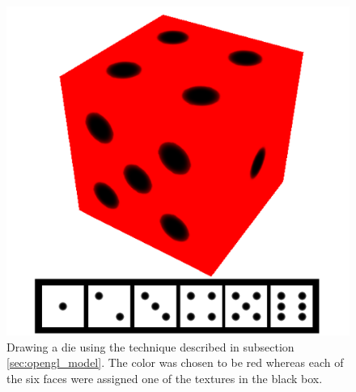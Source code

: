 \begin{figure}[h]
\begin{center}
\includegraphics[width=\textwidth, trim=0cm 0cm 0cm 0cm, clip]{opengl/figures/die.png}
\end{center}
\caption{Drawing a die using the technique described in subsection \ref{sec:opengl_model}. The color was chosen to be red whereas each of the six faces were assigned one of the textures in the black box.}
\label{fig:opengl_die}
\end{figure}